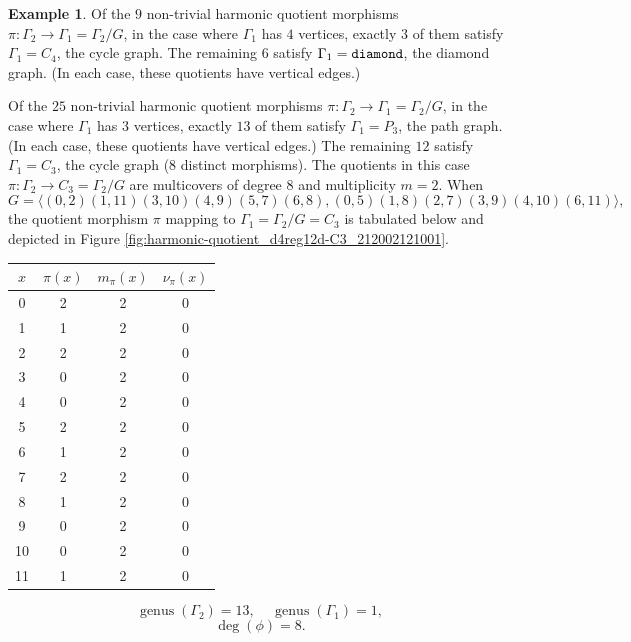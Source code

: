 \documentclass[12pt,letterpaper]{article}
\theoremstyle{definition}
\newtheorem{example}[theorem]{Example}
\DeclareMathOperator{\genus}{genus}
\begin{document}
\begin{example}
{Of the $9$ non-trivial harmonic quotient morphisms
$\pi: \Gamma_2\to \Gamma_1=\Gamma_2/G$, in the case where
$\Gamma_1$ has $4$ vertices, exactly $3$ of them
satisfy $\Gamma_1=C_4$, the cycle graph. 
The remaining $6$ satisfy $\Gamma_1={\tt diamond}$, the diamond graph.
(In each case, these quotients have vertical edges.)


Of the $25$ non-trivial harmonic quotient morphisms
$\pi: \Gamma_2\to \Gamma_1=\Gamma_2/G$, in the case where
$\Gamma_1$ has $3$ vertices, exactly $13$ of them
satisfy $\Gamma_1=P_3$, the path graph.
(In each case, these quotients have vertical edges.)
The remaining $12$ satisfy $\Gamma_1=C_3$, the cycle graph
($8$ distinct morphisms).
The quotients in this case $\pi: \Gamma_2\to C_3=\Gamma_2/G$
are multicovers of degree $8$ and multiplicity $m=2$.
When
\[
G = \langle 
(0,2)(1,11)(3,10)(4,9)(5,7)(6,8), (0,5)(1,8)(2,7)(3,9)(4,10)(6,11)\rangle ,
\]
the quotient morphism $\pi$ mapping to
$\Gamma_1=\Gamma_2/G =C_3$
is tabulated below
and  depicted in Figure \ref{fig:harmonic-quotient_d4reg12d-C3_212002121001}.

\begin{center}
\begin{tabular}{c|c|c|c}  
  $x$ & $\pi(x)$ & $m_\pi(x)$ & $\nu_\pi(x)$   \\ \hline
  0   &    2   &        2         &  0  \\ 
  1   &    1   &        2         &  0  \\ 
  2   &    2   &        2         &  0  \\ 
  3   &    0   &        2         &  0   \\
  4   &    0   &        2         &  0   \\
  5   &    2   &        2         &  0   \\
  6   &    1   &        2         &  0   \\
  7   &    2   &        2         &  0   \\
  8   &    1   &        2         &  0   \\
  9   &    0   &        2         &  0  \\   
  10  &    0  &         2         &  0  \\
  11  &    1   &        2         &  0  \\  
\end{tabular}
\end{center}

\[
  \genus(\Gamma_2) =13,\ \ \ \ \
  \genus(\Gamma_1) =1,
\]
\[
\deg(\phi) =8.
\]

}
\end{example}
\end{document}
